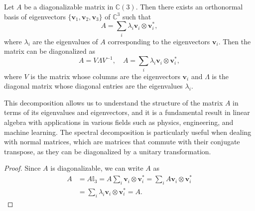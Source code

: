 \begin{theorem}
    Let \(A\) be a diagonalizable matrix in \(\mathbb{C}(3)\). Then there exists an orthonormal basis of eigenvectors \(\{\mathbf{v}_1, \mathbf{v}_2, \mathbf{v}_3\}\) of \(\mathbb{C}^3\) such that
    \[
        A = \sum_{i} \lambda_i \mathbf{v}_i \otimes \mathbf{v}_i^*,
    \]
    where \(\lambda_i\) are the eigenvalues of \(A\) corresponding to the eigenvectors \(\mathbf{v}_i\). Then the matrix can be diagonalized as
    \[
        A = V \Lambda V^{-1}, \quad A = \sum_{i} \lambda_i \mathbf{v}_i \otimes \mathbf{v}_i^*,
    \]
    where \(V\) is the matrix whose columns are the eigenvectors \(\mathbf{v}_i\) and \(\Lambda\) is the diagonal matrix whose diagonal entries are the eigenvalues \(\lambda_i\).
\end{theorem}

This decomposition allows us to understand the structure of the matrix \(A\) in terms of its eigenvalues and eigenvectors, and it is a fundamental result in linear algebra with applications in various fields such as physics, engineering, and machine learning. The spectral decomposition is particularly useful when dealing with normal matrices, which are matrices that commute with their conjugate transpose, as they can be diagonalized by a unitary transformation.

\begin{proof}
    Since \(A\) is diagonalizable, we can write \(A\) as
    \[
        \begin{aligned}
            A & = A \mathbb{I}_3 = A \sum_{i} \mathbf{v}_i \otimes \mathbf{v}_i^* = \sum_{i} A \mathbf{v}_i \otimes \mathbf{v}_i^* \\
              & = \sum_{i} \lambda_i \mathbf{v}_i \otimes \mathbf{v}_i^*= A.
        \end{aligned}
    \]
\end{proof}